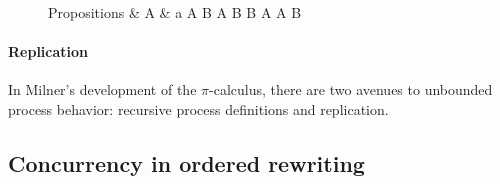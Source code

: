 \begin{figure}
\begin{syntax*}
  Propositions &
    A & a \mid {}
      \mid A \fuse B \mid \one
      \mid A \limp B \mid B \pmir A \mid A \with B \mid \top
\end{syntax*}
\end{figure}

\paragraph*{Replication}

In Milner's development of the $\pi$-calculus, there are two avenues to unbounded process behavior: recursive process definitions and replication.

\autocite{Aranda+:FMCO06}


\subsection{Concurrency in ordered rewriting}


